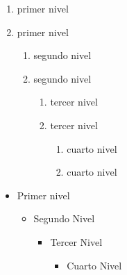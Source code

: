 \documentclass{article}
\begin{document}
\renewcommand{\labelenumii}{\Roman{enumii}} 

\begin{enumerate}
  \item primer nivel
  \item primer nivel
  \begin{enumerate}
    \item segundo nivel
    \item segundo nivel
    \begin{enumerate}
      \item tercer nivel
      \item tercer nivel
      \begin{enumerate}
        \item cuarto nivel
        \item cuarto nivel
      \end{enumerate}
    \end{enumerate}
  \end{enumerate}
\end{enumerate}

\renewcommand{\labelitemi}{\color{blue}$\blacksquare$}
\renewcommand\labelitemii{\color{blue}$\square$}

\begin{itemize}
  \item  Primer nivel
  \begin{itemize}
    \item  Segundo Nivel
    \begin{itemize}
      \item  Tercer Nivel
      \begin{itemize}
        \item  Cuarto Nivel
      \end{itemize}
    \end{itemize}
  \end{itemize}
\end{itemize}
\end{document}
